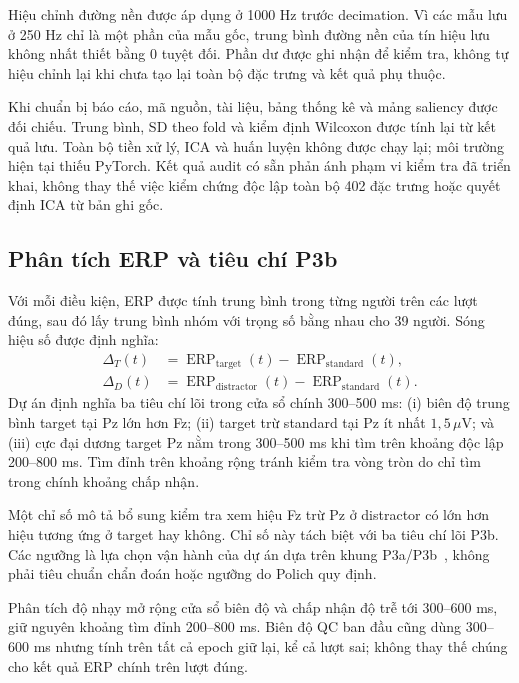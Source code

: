 \documentclass[11pt,a4paper]{article}
\begin{document}
Hiệu chỉnh đường nền được áp dụng ở 1000 Hz trước decimation. Vì các mẫu lưu ở 250 Hz chỉ là một phần của mẫu gốc, trung bình đường nền của tín hiệu lưu không nhất thiết bằng 0 tuyệt đối. Phần dư được ghi nhận để kiểm tra, không tự hiệu chỉnh lại khi chưa tạo lại toàn bộ đặc trưng và kết quả phụ thuộc.

Khi chuẩn bị báo cáo, mã nguồn, tài liệu, bảng thống kê và mảng saliency được đối chiếu. Trung bình, SD theo fold và kiểm định Wilcoxon được tính lại từ kết quả lưu. Toàn bộ tiền xử lý, ICA và huấn luyện không được chạy lại; môi trường hiện tại thiếu PyTorch. Kết quả audit có sẵn phản ánh phạm vi kiểm tra đã triển khai, không thay thế việc kiểm chứng độc lập toàn bộ 402 đặc trưng hoặc quyết định ICA từ bản ghi gốc.

\subsection{Phân tích ERP và tiêu chí P3b}
Với mỗi điều kiện, ERP được tính trung bình trong từng người trên các lượt đúng, sau đó lấy trung bình nhóm với trọng số bằng nhau cho 39 người. Sóng hiệu số được định nghĩa:
\begin{equation}
\begin{aligned}
\Delta_T(t)&=\operatorname{ERP}_{\mathrm{target}}(t)-\operatorname{ERP}_{\mathrm{standard}}(t),\\
\Delta_D(t)&=\operatorname{ERP}_{\mathrm{distractor}}(t)-\operatorname{ERP}_{\mathrm{standard}}(t).
\end{aligned}
\end{equation}
Dự án định nghĩa ba tiêu chí lõi trong cửa sổ chính 300--500 ms: (i) biên độ trung bình target tại Pz lớn hơn Fz; (ii) target trừ standard tại Pz ít nhất $1{,}5\,\mu$V; và (iii) cực đại dương target Pz nằm trong 300--500 ms khi tìm trên khoảng độc lập 200--800 ms. Tìm đỉnh trên khoảng rộng tránh kiểm tra vòng tròn do chỉ tìm trong chính khoảng chấp nhận.

Một chỉ số mô tả bổ sung kiểm tra xem hiệu Fz trừ Pz ở distractor có lớn hơn hiệu tương ứng ở target hay không. Chỉ số này tách biệt với ba tiêu chí lõi P3b. Các ngưỡng là lựa chọn vận hành của dự án dựa trên khung P3a/P3b~\cite{polich}, không phải tiêu chuẩn chẩn đoán hoặc ngưỡng do Polich quy định.

Phân tích độ nhạy mở rộng cửa sổ biên độ và chấp nhận độ trễ tới 300--600 ms, giữ nguyên khoảng tìm đỉnh 200--800 ms. Biên độ QC ban đầu cũng dùng 300--600 ms nhưng tính trên tất cả epoch giữ lại, kể cả lượt sai; không thay thế chúng cho kết quả ERP chính trên lượt đúng.
\end{document}
